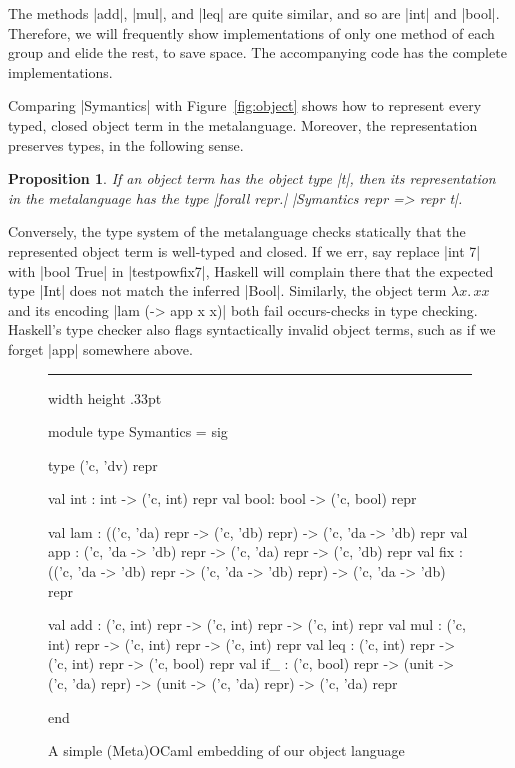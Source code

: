 \documentclass[preprint]{sigplanconf}
\newtheorem{prop}{Proposition}
\newcommand{\fun}[1]{\mathopen{\lambda\mathord{#1}.\,}}
\newenvironment{floatrule}
    {\hrule width \hsize height .33pt \vspace{.5pc}}
    {\par\addvspace{1ex}}
\begin{document}
The methods |add|, |mul|, and |leq| are quite similar, and so are
|int| and |bool|. Therefore, we will frequently show implementations of
only one method of each group and elide the rest, to save space. The
accompanying code has the complete implementations.

Comparing |Symantics| with Figure~\ref{fig:object}
shows how to represent every typed, closed object term in the
metalanguage. Moreover, the representation preserves types, in the following
sense.
\begin{prop}
If an object term has the object type |t|, then its
representation in the metalanguage has the type 
|forall repr.| |Symantics repr => repr t|.
\end{prop}
Conversely, the type system of the metalanguage checks statically that the
represented object term is well-typed and closed.
If we err, say replace |int 7| with |bool True| in
|testpowfix7|, Haskell will complain there that the expected type |Int| does not
match the inferred |Bool|.  Similarly, the object term $\fun{x}xx$ and its
encoding |lam (\x -> app x x)| both fail occurs-checks in type checking.
Haskell's type checker also flags syntactically invalid object terms, such as if
we forget |app| somewhere above.

\begin{figure*}
\begin{floatrule}
\begin{code}
module type Symantics = sig

  type ('c, 'dv) repr

  val int : int  -> ('c, int) repr
  val bool: bool -> ('c, bool) repr

  val lam : (('c, 'da) repr -> ('c, 'db) repr) -> ('c, 'da -> 'db) repr
  val app : ('c, 'da -> 'db) repr -> ('c, 'da) repr -> ('c, 'db) repr
  val fix : (('c, 'da -> 'db) repr -> ('c, 'da -> 'db) repr) -> ('c, 'da -> 'db) repr

  val add : ('c, int) repr -> ('c, int) repr -> ('c, int) repr
  val mul : ('c, int) repr -> ('c, int) repr -> ('c, int) repr
  val leq : ('c, int) repr -> ('c, int) repr -> ('c, bool) repr
  val if_ : ('c, bool) repr -> (unit -> ('c, 'da) repr) -> (unit -> ('c, 'da) repr) -> ('c, 'da) repr

end
\end{code}
\end{floatrule}
\caption{A simple (Meta)OCaml embedding of our object language}
\label{fig:ocaml-simple}
\end{figure*}
\end{document}
